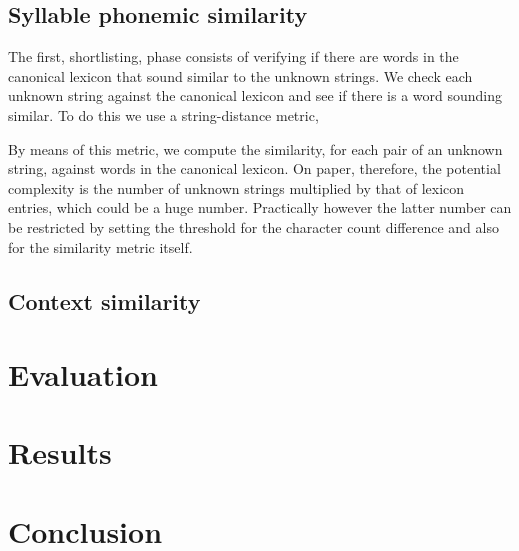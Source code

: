 \documentclass[11pt]{article}
\begin{document}
\subsection{Syllable phonemic similarity}

The first, shortlisting, phase consists of verifying if there are words in the canonical lexicon that sound similar to the unknown strings. We check each unknown string against the canonical lexicon and see if there is a word sounding similar. To do this we use a string-distance metric,  \cite{}


By means of this metric, we compute the similarity, for each pair of an unknown string, against words in the canonical lexicon. On paper, therefore, the potential complexity is the number of unknown strings multiplied by that of lexicon entries, which could be a huge number. Practically however the latter number can be restricted by setting the threshold for the character count difference and also for the similarity metric itself. 



\subsection{Context similarity}



\section{Evaluation}

\section{Results}

\section{Conclusion}
\end{document}
